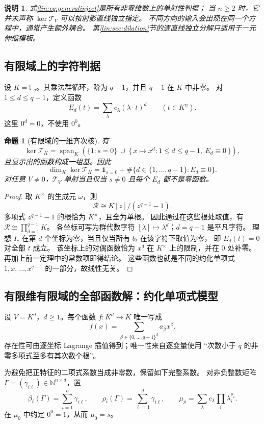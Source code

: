 \documentclass[11pt,a4paper,oneside,openany]{book}
\theoremstyle{lecture}
\newtheorem{proposition}[theorem]{命题}
\newtheorem{remark}[theorem]{说明}
\newcommand{\N}{\mathbb N}
\newcommand{\Span}{\operatorname{span}}
\newcommand{\T}{\mathcal T}
\numberwithin{equation}{section}
\begin{document}
\begin{remark}
式\eqref{lin:eq:generalinject}是所有非零维数上的单射性判据；
当 $n\ge2$ 时，它并未声称 $\ker\T_V$ 可以按射影直线独立指定。
不同方向的输入会出现在同一个方程中，通常产生额外耦合。
第\ref{lin:sec:dilation}节的逐直线独立分解只适用于一元伸缩模板。
\end{remark}

\subsection{有限域上的字符判据}
设 $K=\mathbb F_q$。其乘法群循环，阶为 $q-1$，并且 $q-1$ 在 $K$ 中非零。
对 $1\le d\le q-1$，定义函数
\[
 E_d(t)=\sum_\lambda c_\lambda(\lambda\cdot t)^d
 \qquad(t\in K^n).
\]
这里 $0^d=0$，不使用 $0^0$。

\begin{proposition}[有限域的一维齐次核]\label{lin:prop:finitechars}
有
\[
 \ker\T_K
 =
 \Span_K\!\left(
 \{1:s=0\}\ \cup\
 \{\,x\mapsto x^d:1\le d\le q-1,\ E_d\equiv0\,\}
 \right),
\]
且显示出的函数构成一组基。因此
\[
 \dim_K\ker\T_K=\mathbf1_{s=0}
 +\#\{d\in\{1,\ldots,q-1\}:E_d\equiv0\}.
\]
对任意 $V\ne0$，$\T_V$ 单射当且仅当 $s\ne0$ 且每个 $E_d$ 都不是零函数。
\end{proposition}
\begin{proof}
取 $K^\times$ 的生成元 $\omega$，则
\[
 \mathscr R\cong K[z]/(z^{q-1}-1).
\]
多项式 $z^{q-1}-1$ 的根恰为 $K^\times$，且全为单根。
因此通过在这些根处取值，有
$\mathscr R\cong\prod_{d=1}^{q-1}K$。
各坐标可写为群代数字符
$[\lambda]\mapsto\lambda^d$；$d=q-1$ 是平凡字符。
理想 $I_c$ 在第 $d$ 个坐标为零，当且仅当所有 $b_t$ 在该字符下取值为零，
即 $E_d(t)=0$ 对全部 $t$ 成立。
该坐标上的对偶函数恰为 $x^d$ 在 $K^\times$ 上的限制，并在 $0$ 处补零。
再加上前一定理中的常数项即得结论。
这些函数也就是不同的约化单项式 $1,x,\ldots,x^{q-1}$ 的一部分，故线性无关。
\end{proof}

\subsection{有限维有限域的全部函数解：约化单项式模型}
设 $V=K^d$，$d\ge1$。每个函数 $f:K^d\to K$ 唯一写成
\[
 f(x)=\sum_{\beta\in\{0,\ldots,q-1\}^d}a_\beta x^\beta.
\]
存在性可由逐坐标 Lagrange 插值得到；唯一性来自逐变量使用
“次数小于 $q$ 的非零多项式至多有其次数个根”。

为避免把正特征的二项式系数当成非零数，保留如下完整系数。
对非负整数矩阵 $\Gamma=(\gamma_{i\ell})\in\N^{n\times d}$，置
\[
 \beta_\ell(\Gamma)=\sum_{i=1}^n\gamma_{i\ell},\qquad
 \rho_i(\Gamma)=\sum_{\ell=1}^d\gamma_{i\ell},\qquad
 \mu_\rho=\sum_\lambda c_\lambda\prod_i\lambda_i^{\rho_i}.
\]
在 $\mu_0$ 中约定 $0^0=1$，从而 $\mu_0=s$。
\end{document}
